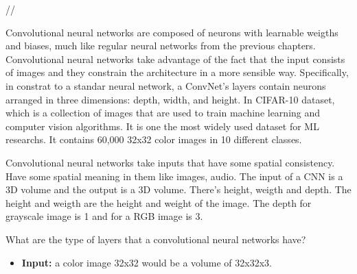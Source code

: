 // 

Convolutional neural networks are composed of neurons with learnable weigths and biases, much like regular neural networks from the previous chapters. 
Convolutional neural networks take advantage of the fact that the input consists of images and they constrain the architecture in a more sensible way. 
Specifically, in constrat to a standar neural network, a ConvNet's layers contain neurons arranged in three dimensions: depth, width, and height. 
In CIFAR-10 dataset, which is a collection of images that are used to train machine learning and computer vision algorithms. It is one the most widely used dataset for ML researchs. 
It contains 60,000 32x32 color images in 10 different classes.  



Convolutional neural networks take inputs that have some spatial consistency. Have some spatial meaning in them like images, audio.
The input of a CNN is a 3D volume and the output is a 3D volume. There's height, weigth and depth. The height and weigth are the height and weight of the image. 
The depth for grayscale image is 1 and for a RGB image is 3. 

What are the type of layers that a convolutional neural networks have?
\begin{itemize}
    \item \textbf{Input:} a color image 32x32 would be a volume of 32x32x3.
\end{itemize}

